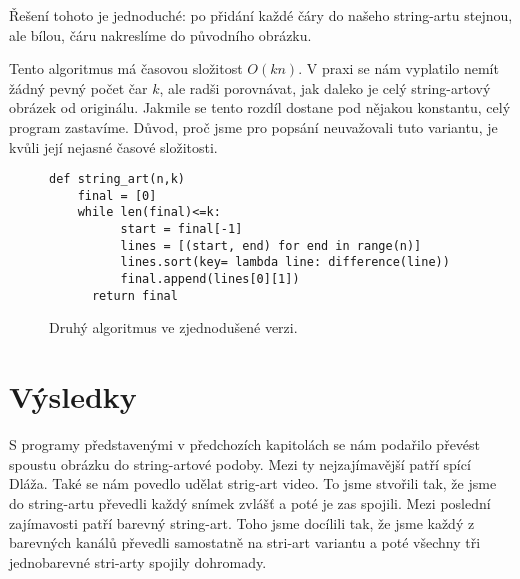 \documentclass{article}
\begin{document}
Řešení tohoto je jednoduché: po přidání každé čáry do našeho string-artu stejnou,
ale bílou, čáru nakreslíme do původního obrázku.

Tento algoritmus má časovou složitost $O(kn)$. V praxi se nám vyplatilo nemít
žádný pevný počet čar $k$, ale radši porovnávat, jak daleko je celý string-artový obrázek od
originálu. Jakmile se tento rozdíl dostane pod nějakou konstantu, celý
program zastavíme. Důvod, proč jsme pro popsání neuvažovali tuto variantu, je kvůli její
nejasné časové složitosti. 

\begin{figure}
 \label{fig:second}
\begin{mdframed}[style=MyFrame]
\begin{lstlisting}[style=metoo]
def string_art(n,k)
    final = [0]
    while len(final)<=k:
	      start = final[-1]
	      lines = [(start, end) for end in range(n)]
	      lines.sort(key= lambda line: difference(line))
	      final.append(lines[0][1])
	  return final
 \end{lstlisting}
\end{mdframed}

 \caption{Druhý algoritmus ve zjednodušené verzi.}
\end{figure}




\section{Výsledky}
\label{sec:vysledky}
S programy představenými v předchozích kapitolách se nám podařilo převést spoustu
obrázku do string-artové podoby. Mezi ty nejzajímavější patří spící Dláža. Také
se nám povedlo udělat strig-art video. To jsme stvořili tak, že jsme do
string-artu převedli každý snímek zvlášť a poté je zas spojili. Mezi poslední
zajímavosti patří barevný string-art. Toho jsme docílili tak, že jsme každý z
barevných kanálů převedli samostatně na stri-art variantu a poté všechny tři
jednobarevné stri-arty spojily dohromady.

\end{document}
